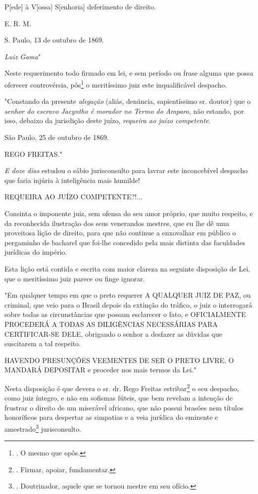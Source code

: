 P{[}ede{]} à V{[}ossa{]} S{[}enhoria{]} deferimento de direito.

E. R. M.

S. Paulo, 13 de outubro de 1869.

\emph{Luiz Gama}"

Neste requerimento todo firmado em lei, e sem período ou frase alguma
que possa oferecer controvérsia, pôs\footnote{. O mesmo que opôs.} o
meritíssimo juiz este inqualificável despacho.

"Constando da presente \emph{alegação} (aliás, denúncia, sapientíssimo
sr. doutor) que o \emph{senhor do escravo Jacyntho é morador no Termo do
Amparo}, não estando, por isso, debaixo da jurisdição deste juízo,
\emph{requeira ao juízo competente}.

São Paulo, 25 de outubro de 1869.

REGO FREITAS."

\emph{E doze dias} estudou o sábio jurisconsulto para lavrar este
inconcebível despacho que faria injúria à inteligência mais humilde!

REQUEIRA AO JUÍZO COMPETENTE?!...

Consinta o imponente juiz, sem ofensa do seu amor próprio, que muito
respeito, e da reconhecida ilustração dos seus venerandos mestres, que
eu lhe dê uma proveitosa lição de direito, para que não continue a
enxovalhar em público o pergaminho de bacharel que foi-lhe concedido
pela mais distinta das faculdades jurídicas do império.

Esta lição está contida e escrita com maior clareza na seguinte
disposição de Lei, que o meritíssimo juiz parece ou finge ignorar.

"Em qualquer tempo em que o preto requerer A QUALQUER JUIZ DE PAZ, ou
criminal, que veio para o Brasil depois da extinção do tráfico, o juiz o
interrogará sobre todas as circunstâncias que possam esclarecer o fato,
e OFICIALMENTE PROCEDERÁ A TODAS AS DILIGÊNCIAS NECESSÁRIAS PARA
CERTIFICAR-SE DELE, obrigando o senhor a desfazer as dúvidas que
suscitarem a tal respeito.

HAVENDO PRESUNÇÕES VEEMENTES DE SER O PRETO LIVRE, O MANDARÁ DEPOSITAR e
proceder nos mais termos da Lei."

Nesta disposição é que devera o sr. dr. Rego Freitas estribar\footnote{.
  Firmar, apoiar, fundamentar.} o seu despacho, como juiz íntegro, e não
em sofismas fúteis, que bem revelam a intenção de frustrar o direito de
um miserável africano, que não possui brasões nem títulos honoríficos
para despertar as simpatias e a veia jurídica do eminente e
amestrado\footnote{. Doutrinador, aquele que se tornou mestre em seu
  ofício.} jurisconsulto.

